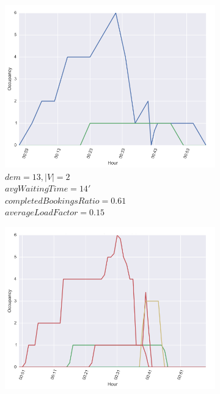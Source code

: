 \documentclass[12pt,a4paper]{article}
\begin{document}
\begin{figure}[]
\caption{Average occupancy of each vehicles at each minute of the simulated hour for the combinations of $V^{-}, V^{+}, dem^{-}$ and $dem^{+}$.}
  \centering
\begin{subfigure}[b]{0.48\textwidth}
  \includegraphics[width=\linewidth]{./images/dem13v2}
  \caption{$dem = 13, |V| = 2$\\ $avgWaitingTime = 14'$\\ $completedBookingsRatio = 0.61$ \\ $averageLoadFactor = 0.15$}
  \label{dem13v2}
\end{subfigure}
\begin{subfigure}[b]{0.48\textwidth}
  \includegraphics[width=\linewidth]{./images/dem13v10}

\end{subfigure}
\end{figure}
\end{document}
